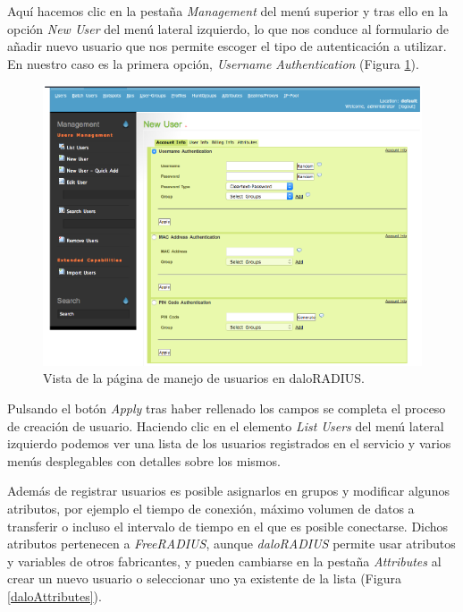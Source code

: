 Aquí hacemos clic en la pestaña \emph{Management} del menú superior y tras ello en la opción \emph{New User} del menú lateral izquierdo, lo que nos conduce al formulario de añadir nuevo usuario que nos permite escoger el tipo de autenticación a utilizar. En nuestro caso es la primera opción, \emph{Username Authentication} (Figura \ref{daloNewUser}).

\begin{figure}[!t]
\begin{center}
\includegraphics[width=0.75\linewidth]{./5_AnalisisOrganico/Img/daloNewUser.png}
\end{center}
\caption{Vista de la página de manejo de usuarios en daloRADIUS.}
\label{daloNewUser}
\end{figure}

Pulsando el botón \emph{Apply} tras haber rellenado los campos se completa el proceso de creación de usuario. Haciendo clic en el elemento \emph{List Users} del menú lateral izquierdo podemos ver una lista de los usuarios registrados en el servicio y varios menús desplegables con detalles sobre los mismos.

Además de registrar usuarios es posible asignarlos en grupos y modificar algunos atributos, por ejemplo el tiempo de conexión, máximo volumen de datos a transferir o incluso el intervalo de tiempo en el que es posible conectarse. Dichos atributos pertenecen a \emph{FreeRADIUS}, aunque \emph{daloRADIUS} permite usar atributos y variables de otros fabricantes, y pueden cambiarse en la pestaña \emph{Attributes} al crear un nuevo usuario o seleccionar uno ya existente de la lista (Figura \ref{daloAttributes}).

